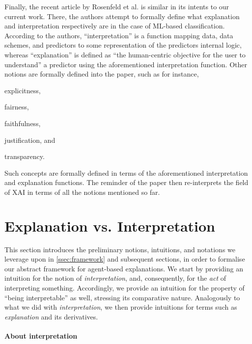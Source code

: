 \documentclass[12pt,a4paper,openright,twoside]{book}
\begin{document}
Finally, the recent article by Rosenfeld et al. \cite{RosenfeldR2019} is similar in its intents to our current work.
%
There, the authors attempt to formally define what explanation and interpretation respectively are in the case of ML-based classification.
%
%
%
According to the authors, ``interpretation'' is a function mapping data, data schemes, and predictors to some representation of the predictors internal logic, whereas ``explanation'' is defined as ``the human-centric objective for the user to understand'' a predictor using the aforementioned interpretation function.
%
Other notions are formally defined into the paper, such as for instance,
%
\begin{inlinelist}
    \item explicitness,
    \item fairness,
    \item faithfulness,
    \item justification, and
    \item transparency.
\end{inlinelist}
%
Such concepts are formally defined in terms of the aforementioned interpretation and explanation functions.
%
The reminder of the paper then re-interprets the field of XAI in terms of all the notions mentioned so far.

\section{Explanation vs. Interpretation}\label{sec:exp-int-basics}

This section introduces the preliminary notions, intuitions, and notations we leverage upon in \cref{ssec:framework} and subsequent sections, in order to formalise our abstract framework for agent-based explanations.
%
We start by providing an intuition for the notion of \emph{interpretation}, and, consequently, for the \emph{act} of interpreting something.
%
Accordingly, we provide an intuition for the property of ``being interpretable'' as well, stressing its comparative nature.
%
Analogously to what we did with \emph{interpretation}, we then provide intuitions for terms such as \emph{explanation} and its derivatives.

\paragraph{About interpretation}
\end{document}
